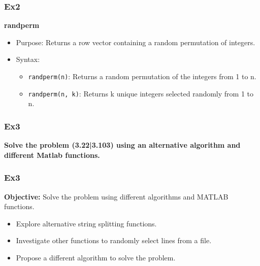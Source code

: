 \documentclass[
	11pt, %
]{beamer}
\begin{document}
\begin{frame}
    \frametitle{Ex2}

    \textbf{randperm}
    
    \begin{itemize}
        \item Purpose: Returns a row vector containing a random permutation of integers.
        \item Syntax:
            \begin{itemize}
                \item \texttt{randperm(n)}: Returns a random permutation of the integers from 1 to n.
                \item \texttt{randperm(n, k)}: Returns k unique integers selected randomly from 1 to n.
            \end{itemize}
    \end{itemize}
\end{frame}

\begin{frame}
	\frametitle{Ex3}

	\textbf{Solve the problem (3.22|3.103) using an alternative algorithm and different Matlab functions.}
    
\end{frame}
\begin{frame}
	\frametitle{Ex3}

	\textbf{Objective:} Solve the problem using different algorithms and MATLAB functions.
    \begin{itemize}
        \item Explore alternative string splitting functions.
        \item Investigate other functions to randomly select lines from a file.
        \item Propose a different algorithm to solve the problem.
    \end{itemize}
\end{frame}
\end{document}
